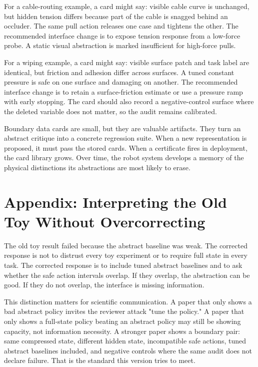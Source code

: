 \documentclass{article}
\begin{document}
For a cable-routing example, a card might say: visible cable curve is unchanged,
but hidden tension differs because part of the cable is snagged behind an
occluder. The same pull action releases one case and tightens the other. The
recommended interface change is to expose tension response from a low-force
probe. A static visual abstraction is marked insufficient for high-force pulls.

For a wiping example, a card might say: visible surface patch and task label are
identical, but friction and adhesion differ across surfaces. A tuned constant
pressure is safe on one surface and damaging on another. The recommended
interface change is to retain a surface-friction estimate or use a pressure ramp
with early stopping. The card should also record a negative-control surface where
the deleted variable does not matter, so the audit remains calibrated.

Boundary data cards are small, but they are valuable artifacts. They turn an
abstract critique into a concrete regression suite. When a new representation is
proposed, it must pass the stored cards. When a certificate fires in deployment,
the card library grows. Over time, the robot system develops a memory of the
physical distinctions its abstractions are most likely to erase.

\section{Appendix: Interpreting the Old Toy Without Overcorrecting}

The old toy result failed because the abstract baseline was weak. The corrected
response is not to distrust every toy experiment or to require full state in
every task. The corrected response is to include tuned abstract baselines and to
ask whether the safe action intervals overlap. If they overlap, the abstraction
can be good. If they do not overlap, the interface is missing information.

This distinction matters for scientific communication. A paper that only shows a
bad abstract policy invites the reviewer attack "tune the policy." A paper that
only shows a full-state policy beating an abstract policy may still be showing
capacity, not information necessity. A stronger paper shows a boundary pair:
same compressed state, different hidden state, incompatible safe actions, tuned
abstract baselines included, and negative controls where the same audit does not
declare failure. That is the standard this version tries to meet.
\end{document}
